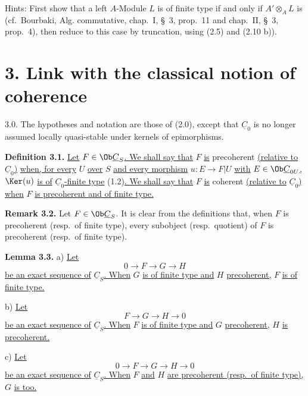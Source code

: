 Hints: First show that a left \(A\)-Module \(L\) is of finite type if and only if \(A'\otimes_A L\) is (cf.\ Bourbaki, Alg. commutative, chap.\ I, \S\ 3, prop.\ 11 and chap.\ II, \S\ 3, prop.\ 4), then reduce to this case by truncation, using (2.5) and (2.10 b)).

\section*{3. Link with the classical notion of coherence}

3.0. The hypotheses and notation are those of (2.0), except that \(\underline{C}_0\) is no longer assumed locally quasi-stable under kernels of epimorphisms.

\textbf{Definition 3.1.} \uline{Let} \(F\in\Ob\underline{C}_S\)\uline{. We shall say that} \(F\) \uline{is} precoherent \uline{(relative to} \(\underline{C}_0\)\uline{)} \uline{when, for every} \(U\) \uline{over} \(S\) \uline{and every morphism} \(u:E\to F|U\) \uline{with} \(E\in\Ob\underline{C}_{0U}\)\uline{,} \(\Ker(u)\) \uline{is of} \(\underline{C}_0\)\uline{-finite type} (1.2)\uline{. We shall say that} \(F\) \uline{is} coherent \uline{(relative to} \(\underline{C}_0\)\uline{) when} \(F\) \uline{is precoherent and of finite type.}

\textbf{Remark 3.2.} Let \(F\in\Ob\underline{C}_S\). It is clear from the definitions that, when \(F\) is precoherent (resp.\ of finite type), every subobject (resp.\ quotient) of \(F\) is precoherent (resp.\ of finite type).

\textbf{Lemma 3.3.} a) \uline{Let}
\[
  0\longrightarrow F\longrightarrow G\longrightarrow H
\]
%
\uline{be an exact sequence of} \(\underline{C}_S\)\uline{. When} \(G\) \uline{is of finite type and} \(H\) \uline{precoherent,} \(F\) \uline{is of finite type.}

b) \uline{Let}
\[
  F\longrightarrow G\longrightarrow H\longrightarrow 0
\]
\uline{be an exact sequence of} \(\underline{C}_S\)\uline{. When} \(F\) \uline{is of finite type and} \(G\) \uline{precoherent,} \(H\) \uline{is precoherent.}

c) \uline{Let}
\[
  0\longrightarrow F\longrightarrow G\longrightarrow H\longrightarrow 0
\]
\uline{be an exact sequence of} \(\underline{C}_S\)\uline{. When} \(F\) \uline{and} \(H\) \uline{are precoherent (resp.\ of finite type),} \(G\) \uline{is too.}

